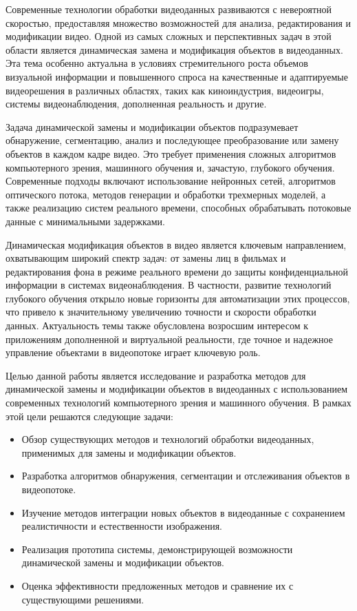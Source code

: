 \introduction %

Современные технологии обработки видеоданных развиваются с невероятной скоростью, предоставляя множество возможностей для анализа, редактирования и модификации видео. Одной из самых сложных и перспективных задач в этой области является динамическая замена и модификация объектов в видеоданных. Эта тема особенно актуальна в условиях стремительного роста объемов визуальной информации и повышенного спроса на качественные и адаптируемые видеорешения в различных областях, таких как киноиндустрия, видеоигры, системы видеонаблюдения, дополненная реальность и другие.

Задача динамической замены и модификации объектов подразумевает обнаружение, сегментацию, анализ и последующее преобразование или замену объектов в каждом кадре видео. Это требует применения сложных алгоритмов компьютерного зрения, машинного обучения и, зачастую, глубокого обучения. Современные подходы включают использование нейронных сетей, алгоритмов оптического потока, методов генерации и обработки трехмерных моделей, а также реализацию систем реального времени, способных обрабатывать потоковые данные с минимальными задержками.

Динамическая модификация объектов в видео является ключевым направлением, охватывающим широкий спектр задач: от замены лиц в фильмах и редактирования фона в режиме реального времени до защиты конфиденциальной информации в системах видеонаблюдения. В частности, развитие технологий глубокого обучения открыло новые горизонты для автоматизации этих процессов, что привело к значительному увеличению точности и скорости обработки данных. Актуальность темы также обусловлена возросшим интересом к приложениям дополненной и виртуальной реальности, где точное и надежное управление объектами в видеопотоке играет ключевую роль.

Целью данной работы является исследование и разработка методов для динамической замены и модификации объектов в видеоданных с использованием современных технологий компьютерного зрения и машинного обучения. В рамках этой цели решаются следующие задачи:

\begin{itemize}
    \item Обзор существующих методов и технологий обработки видеоданных, применимых для замены и модификации объектов.
    \item Разработка алгоритмов обнаружения, сегментации и отслеживания объектов в видеопотоке.
    \item Изучение методов интеграции новых объектов в видеоданные с сохранением реалистичности и естественности изображения.
    \item Реализация прототипа системы, демонстрирующей возможности динамической замены и модификации объектов.
    \item Оценка эффективности предложенных методов и сравнение их с существующими решениями.
\end{itemize}

